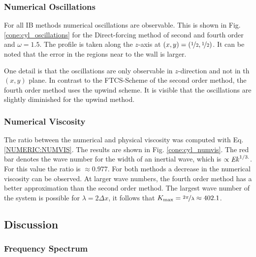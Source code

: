 \subsubsection{Numerical Oscillations}

For all IB methods numerical oscillations are observable.
This is shown in Fig. \ref{cone:cyl_oscillations} for the Direct-forcing method of second and fourth order and $\omega=1.5$.
The profile is taken along the $z$-axis at $(x,y)=(\nicefrac{1}{2},\nicefrac{1}{2})$.
It can be noted that the error  in the regions near to the wall is larger.

One detail is that the oscillations are only observable in $z$-direction and not
in th $(x,y)$ plane.
In contrast to the FTCS-Scheme of the second order method, the fourth order method uses the upwind scheme.
It is visible that the oscillations are slightly diminished for the upwind method.

\subsubsection{Numerical Viscosity}

The ratio between the numerical and physical viscosity was computed with Eq. \ref{NUMERIC:NUMVIS}.
The results are shown in Fig. \ref{cone:cyl_numvis}.
The red bar denotes the wave number for the width of an inertial wave, which is $\propto \mbox{\textit{Ek}}^{1/3.}$.
For this value the ratio is $\approx{0.977}$.
For both methods a decrease in the numerical viscosity can  be observed.
At larger wave numbers, the fourth order method has a better approximation than the second order method.
The largest wave number of the  system is possible for $\lambda = 2\Delta x$,
it follows that $K_{\text{max}} = \nicefrac{2\pi}{\lambda} \approx 402.1$.

\subsection{Discussion}

\subsubsection{Frequency Spectrum}

